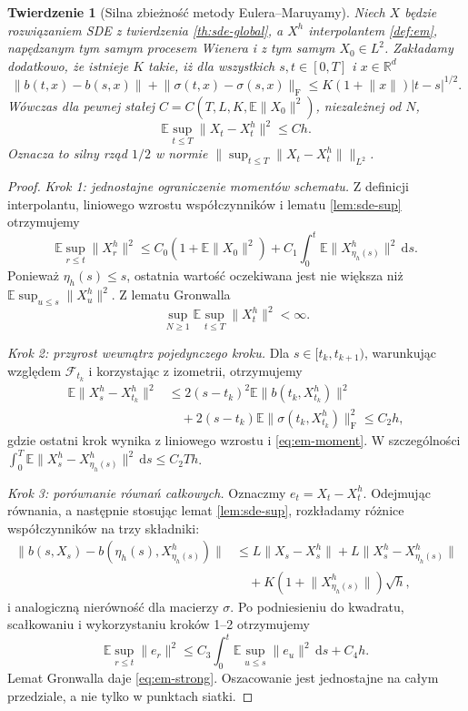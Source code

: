 \documentclass[11pt,a4paper,oneside]{report}
\numberwithin{equation}{chapter}
\theoremstyle{plain}
\newtheorem{twierdzenie}{Twierdzenie}[chapter]
\theoremstyle{definition}
\theoremstyle{remark}
\newcommand{\R}{\mathbb{R}}
\newcommand{\E}{\mathbb{E}}
\newcommand{\calF}{\mathcal{F}}
\newcommand{\dd}{\mathrm{d}}
\newcommand{\norm}[1]{\lVert #1\rVert}
\begin{document}
\begin{twierdzenie}[Silna zbieżność metody Eulera--Maruyamy]\label{thm:volIII:06:06}
\label{th:em-rate}
Niech $X$ będzie rozwiązaniem SDE z twierdzenia
\ref{th:sde-global}, a $X^h$ interpolantem
\ref{def:em}, napędzanym tym samym procesem Wienera
i z tym samym $X_0\in L^2$. Zakładamy dodatkowo,
że istnieje $K$ takie, iż dla wszystkich $s,t\in[0,T]$
i $x\in\R^d$
\[
\norm{b(t,x)-b(s,x)}+
\norm{\sigma(t,x)-\sigma(s,x)}_{\mathrm F}
\le K(1+\norm{x})|t-s|^{1/2}.
\tag{6.12}\label{eq:time-holder}
\]
Wówczas dla pewnej stałej $C=C(T,L,K,\E\norm{X_0}^2)$,
niezależnej od $N$,
\[
\E\sup_{t\le T}\norm{X_t-X_t^h}^2\le Ch.
\tag{6.13}\label{eq:em-strong}
\]
Oznacza to silny rząd $1/2$ w normie
$\|\sup_{t\le T}\norm{X_t-X_t^h}\|_{L^2}$.
\end{twierdzenie}
\begin{proof}
\emph{Krok 1: jednostajne ograniczenie momentów schematu.}
Z definicji interpolantu, liniowego wzrostu
współczynników i lematu \ref{lem:sde-sup} otrzymujemy
\[
\E\sup_{r\le t}\norm{X_r^h}^2
\le C_0(1+\E\norm{X_0}^2)
+C_1\int_0^t\E\norm{X^h_{\eta_h(s)}}^2\,\dd s.
\]
Ponieważ $\eta_h(s)\le s$, ostatnia wartość
oczekiwana jest nie większa niż
$\E\sup_{u\le s}\norm{X_u^h}^2$.
Z lematu Gronwalla
\[
\sup_{N\ge1}\E\sup_{t\le T}\norm{X_t^h}^2<\infty.
\tag{6.14}\label{eq:em-moment}
\]

\emph{Krok 2: przyrost wewnątrz pojedynczego kroku.}
Dla $s\in[t_k,t_{k+1})$, warunkując względem
$\calF_{t_k}$ i korzystając z izometrii,
otrzymujemy
\[
\begin{split}
\E\norm{X_s^h-X_{t_k}^h}^2
&\le2(s-t_k)^2\E\norm{b(t_k,X_{t_k}^h)}^2\\
&\quad+2(s-t_k)\E\norm{\sigma(t_k,X_{t_k}^h)}_{\mathrm F}^2
\le C_2h,
\end{split}
\]
gdzie ostatni krok wynika z liniowego wzrostu i
\eqref{eq:em-moment}. W szczególności
$\int_0^T\E\norm{X_s^h-X_{\eta_h(s)}^h}^2\,\dd s
\le C_2Th$.

\emph{Krok 3: porównanie równań całkowych.}
Oznaczmy $e_t=X_t-X_t^h$. Odejmując równania,
a następnie stosując lemat \ref{lem:sde-sup},
rozkładamy różnice współczynników na trzy składniki:
\[
\begin{split}
\norm{b(s,X_s)-b(\eta_h(s),X^h_{\eta_h(s)})}
&\le L\norm{X_s-X_s^h}
+L\norm{X_s^h-X^h_{\eta_h(s)}}\\
&\quad+K(1+\norm{X^h_{\eta_h(s)}})\sqrt h,
\end{split}
\]
i analogiczną nierówność dla macierzy $\sigma$.
Po podniesieniu do kwadratu, scałkowaniu i
wykorzystaniu kroków 1--2 otrzymujemy
\[
\E\sup_{r\le t}\norm{e_r}^2
\le C_3\int_0^t\E\sup_{u\le s}\norm{e_u}^2\,\dd s
+C_4h.
\]
Lemat Gronwalla daje \eqref{eq:em-strong}.
Oszacowanie jest jednostajne na całym przedziale,
a nie tylko w punktach siatki.
\end{proof}
\end{document}
